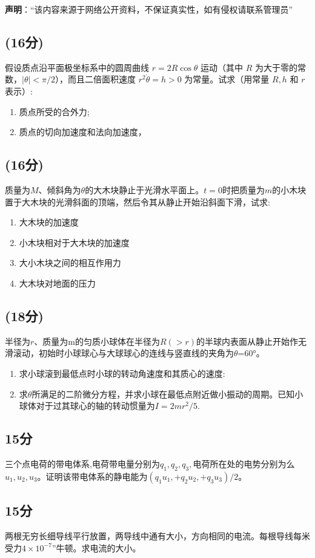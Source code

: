 
\textbf{声明}：“该内容来源于网络公开资料，不保证真实性，如有侵权请联系管理员”

\subsection{(16分)}
假设质点沿平面极坐标系中的圆周曲线 $r = 2R \cos \theta$ 运动（其中 $R$ 为大于零的常数，$\left| \theta \right| < \pi/2$），而且二倍面积速度 $r^2 \dot{\theta} = h > 0$ 为常量。试求（用常量 $R, h$ 和 $r$ 表示）:
\begin{enumerate}
\item 质点所受的合外力;
\item 质点的切向加速度和法向加速度，
\end{enumerate}
\subsection{(16分)}
质量为$M$、倾斜角为$\theta$的大木块静止于光滑水平面上。$t=0$时把质量为$m$的小木块置于大木块的光滑斜面的顶端，然后令其从静止开始沿斜面下滑，试求:
\begin{enumerate}
\item 大木块的加速度
\item 小木块相对于大木块的加速度
\item 大小木块之间的相互作用力
\item 大木块对地面的压力
\end{enumerate}
\subsection{(18分)}
半径为$r$、质量为m的匀质小球体在半径为$R(>r)$的半球内表面从静止开始作无滑滚动，初始时小球球心与大球球心的连线与竖直线的夹角为$\theta$=60°。
\begin{enumerate}
\item 求小球滚到最低点时小球的转动角速度和其质心的速度:
\item 求$\theta$所满足的二阶微分方程，并求小球在最低点附近做小振动的周期。已知小球体对于过其球心的轴的转动惯量为$I=2mr^2/5$.
\end{enumerate}
\subsection{15分}
三个点电荷的带电体系,电荷带电量分别为$q_1,q_2,q_3,$电荷所在处的电势分别为么$u_1,u_2,u_3$。证明该带电体系的静电能为$(q_1u_1,+q_2u_2,+q_3u_3)/2$。
\subsection{15分}
两根无穷长细导线平行放置，两导线中通有大小，方向相同的电流。每根导线每米受力$4\times10^{-7}$”牛顿。求电流的大小。
